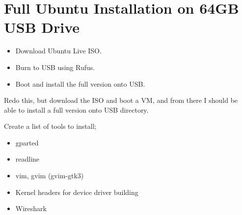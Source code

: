 \documentclass[10pt,twoside]{article}
\begin{document}
\clearpage
\section{Full Ubuntu Installation on 64GB USB Drive}

\begin{itemize}
\item Download Ubuntu Live ISO.
\item Burn to USB using Rufus.
\item Boot and install the full version onto USB.
\end{itemize}

Redo this, but download the ISO and boot a VM, and from there I should be
able to install a full version onto USB directory.

Create a list of tools to install;
%
\begin{itemize}
\item gparted
\item readline
\item vim, gvim (gvim-gtk3)
\item Kernel headers for device driver building
\item Wireshark
\end{itemize}

\end{document}
